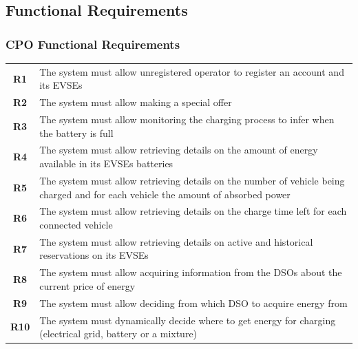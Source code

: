 \subsection{Functional Requirements}


\subsubsection{CPO Functional Requirements}
\begin{table}[H]
    \begin{tabularx}{\textwidth}{cX}
        \toprule
        \textbf{R1}  & The system must allow unregistered operator to register an account and its EVSEs                                                  \\
        \textbf{R2}  & The system must allow making a special offer                                                                                      \\
        \textbf{R3}  & The system must allow monitoring the charging process to infer when the battery is full                                           \\
        \textbf{R4}  & The system must allow retrieving details on the amount of energy available in its EVSEs batteries                                 \\
        \textbf{R5}  & The system must allow retrieving details on the number of vehicle being charged and for each vehicle the amount of absorbed power \\
        \textbf{R6}  & The system must allow retrieving details on the charge time left for each connected vehicle                                       \\
        \textbf{R7}  & The system must allow retrieving details on active and historical reservations on its EVSEs                                       \\
        \textbf{R8}  & The system must allow acquiring information from the DSOs about the current price of energy                                       \\
        \textbf{R9}  & The system must allow deciding from which DSO to acquire energy from                                                              \\
        \textbf{R10} & The system must dynamically decide where to get energy for charging (electrical grid, battery or a mixture)                       \\ \bottomrule
    \end{tabularx}
\end{table}
